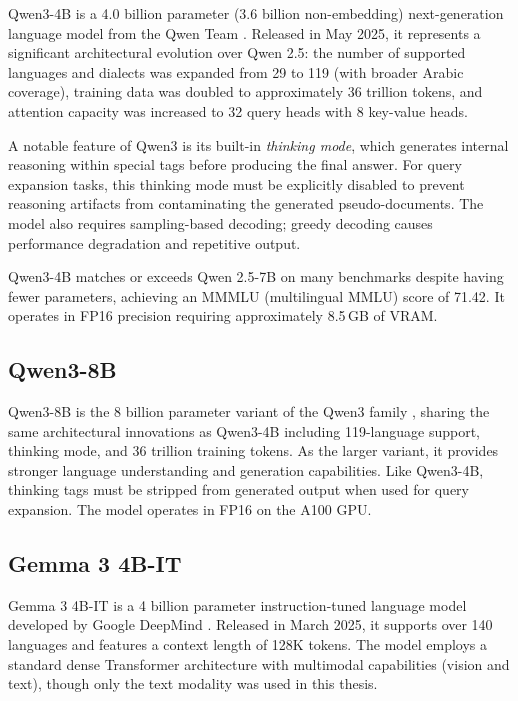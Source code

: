 Qwen3-4B is a 4.0 billion parameter (3.6 billion non-embedding) next-generation language model from the Qwen Team \cite{qwen3_2025}. Released in May 2025, it represents a significant architectural evolution over Qwen 2.5: the number of supported languages and dialects was expanded from 29 to 119 (with broader Arabic coverage), training data was doubled to approximately 36 trillion tokens, and attention capacity was increased to 32 query heads with 8 key-value heads.

A notable feature of Qwen3 is its built-in \textit{thinking mode}, which generates internal reasoning within special tags before producing the final answer. For query expansion tasks, this thinking mode must be explicitly disabled to prevent reasoning artifacts from contaminating the generated pseudo-documents. The model also requires sampling-based decoding; greedy decoding causes performance degradation and repetitive output.

Qwen3-4B matches or exceeds Qwen 2.5-7B on many benchmarks despite having fewer parameters, achieving an MMMLU (multilingual MMLU) score of 71.42. It operates in FP16 precision requiring approximately 8.5\,GB of VRAM.

\subsection{Qwen3-8B}
\label{sec:qwen3_8b}

Qwen3-8B is the 8 billion parameter variant of the Qwen3 family \cite{qwen3_2025}, sharing the same architectural innovations as Qwen3-4B including 119-language support, thinking mode, and 36 trillion training tokens. As the larger variant, it provides stronger language understanding and generation capabilities. Like Qwen3-4B, thinking tags must be stripped from generated output when used for query expansion. The model operates in FP16 on the A100 GPU.

\subsection{Gemma 3 4B-IT}
\label{sec:gemma3}

Gemma 3 4B-IT is a 4 billion parameter instruction-tuned language model developed by Google DeepMind \cite{gemma3_2025}. Released in March 2025, it supports over 140 languages and features a context length of 128K tokens. The model employs a standard dense Transformer architecture with multimodal capabilities (vision and text), though only the text modality was used in this thesis.

